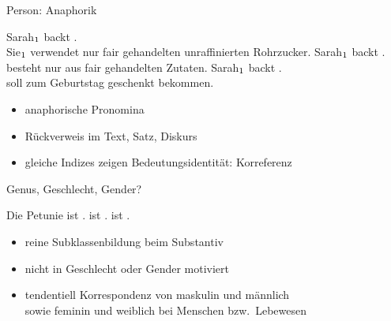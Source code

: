 \begin{frame}
  {Person: Anaphorik}
  \pause
  \begin{exe}
    \ex \alert{Sarah$_{\textnormal{1}}$} backt  .\\
      \alert{Sie$_{\textnormal{1}}$} verwendet nur fair gehandelten unraffinierten Rohrzucker.
    \pause
      \ex \alert{Sarah$_{\textnormal{1}}$} backt  .\\
       besteht nur aus fair gehandelten Zutaten.
    \pause
      \ex \alert{Sarah$_{\textnormal{1}}$} backt  .\\
       soll  zum Geburtstag geschenkt bekommen.
  \end{exe}
  \Halbzeile
  \pause
  \begin{itemize}[<+->]
    \item anaphorische Pronomina
    \item Rückverweis im Text, Satz, Diskurs
    \item gleiche Indizes zeigen Bedeutungsidentität: Korreferenz
  \end{itemize}
\end{frame}

\begin{frame}
  {Genus, Geschlecht, Gender?}
  \pause
  \begin{exe}
    \ex \label{ex:genus039}
    \begin{xlist}
      \ex \alert{Die Petunie} ist .
      \ex {} ist .
      \ex {} ist .
    \end{xlist}
  \end{exe}
  \pause
  \Halbzeile
  \begin{itemize}[<+->]
    \item reine Subklassenbildung beim Substantiv
    \item nicht in Geschlecht oder Gender motiviert
    \item tendentiell Korrespondenz von maskulin und männlich\\
      sowie feminin und weiblich bei Menschen bzw.\ Lebewesen
  \end{itemize}
\end{frame}

